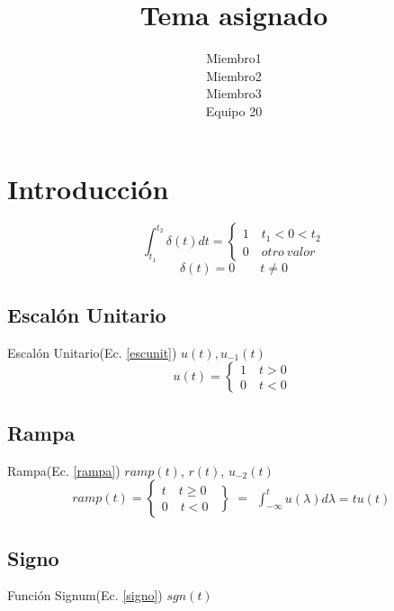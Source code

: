 \documentclass[10pt,a4paper]{report}
\author{Miembro1\\Miembro2\\Miembro3\\Equipo 20}
\title{Tema asignado}
\begin{document}
\thispagestyle{fancy}
\maketitle
\tableofcontents
\newpage
\setcounter{chapter}{1}
\section[Introducción]{Introducción}

\begin{equation}
\int_{t_{1}}^{t_{2}}\delta(t)dt =
\left\{
\begin{aligned}
1\quad t_{1}<0<t_{2}\\
0\quad otro \:valor
\end{aligned}
\right.
\end{equation}
\[
\delta(t)=0\qquad t\neq0
\]
\subsection{Escalón Unitario}
Escalón Unitario(Ec. \ref{escunit}) $u(t), u_{-1}(t)$\\
\begin{equation}
 u(t)=
 \left\{
  \begin{aligned}
   1\quad t>0\\
   0\quad t<0\
  \end{aligned}
 \right.
\label{escunit}
\end{equation}
\subsection{Rampa}
Rampa(Ec. \ref{rampa}) $ramp(t)$, $r(t)$, $u_{-2}(t)$\\

\begin{equation}
ramp(t)=
\left\{
\begin{aligned}
t\quad t\geq0\\
0\quad t<0\
\end{aligned}
\right.
\left\}=
\begin{aligned}
\int_{-\infty}^{t}u(\lambda)d\lambda=tu(t)
\end{aligned}
\right.
\label{rampa}
\end{equation}

\subsection{Signo}
Función Signum(Ec. \ref{signo}) $sgn(t)$\\
\end{document}
